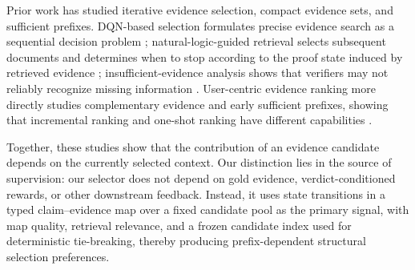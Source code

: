 \documentclass[letterpaper]{article}
\begin{document}
Prior work has studied iterative evidence selection, compact evidence sets, and sufficient prefixes. DQN-based selection formulates precise evidence search as a sequential decision problem \citep{Wan2021DQN}; natural-logic-guided retrieval selects subsequent documents and determines when to stop according to the proof state induced by retrieved evidence \citep{Aly2022NaturalLogic}; insufficient-evidence analysis shows that verifiers may not reliably recognize missing information \citep{Atanasova2022Insufficient}. User-centric evidence ranking more directly studies complementary evidence and early sufficient prefixes, showing that incremental ranking and one-shot ranking have different capabilities \citep{Alt2026EvidenceRanking}.

Together, these studies show that the contribution of an evidence candidate depends on the currently selected context. Our distinction lies in the source of supervision: our selector does not depend on gold evidence, verdict-conditioned rewards, or other downstream feedback. Instead, it uses state transitions in a typed claim--evidence map over a fixed candidate pool as the primary signal, with map quality, retrieval relevance, and a frozen candidate index used for deterministic tie-breaking, thereby producing prefix-dependent structural selection preferences.





\end{document}
